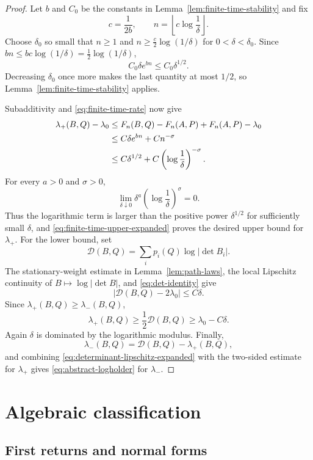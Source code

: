 \documentclass[11pt,a4paper]{amsart}
\theoremstyle{definition}
\theoremstyle{remark}
\numberwithin{equation}{section}
\newcommand{\1}{\boldsymbol 1}
\begin{document}
\begin{proof}
Let $b$ and $C_0$ be the constants in
Lemma~\ref{lem:finite-time-stability} and fix
$$
 c=\frac1{2b},
 \qquad
 n=\left\lfloor c\log\frac1\delta\right\rfloor.
$$
Choose $\delta_0$ so small that $n\ge1$ and
$n\ge\tfrac c2\log(1/\delta)$ for $0<\delta<\delta_0$.  Since
$bn\le bc\log(1/\delta)=\tfrac12\log(1/\delta)$,
\begin{equation}\label{eq:finite-time-smallness-expanded}
 C_0\delta e^{bn}\le C_0\delta^{1/2}.
\end{equation}
Decreasing $\delta_0$ once more makes the last quantity at most
$1/2$, so Lemma~\ref{lem:finite-time-stability} applies.

Subadditivity and \eqref{eq:finite-time-rate} now give
\begin{align}
 \lambda_+(B,Q)-\lambda_0
 &\le F_n(B,Q)-F_n(A,P)+F_n(A,P)-\lambda_0\notag\\
 &\le C\delta e^{bn}+Cn^{-\sigma}\notag\\
 &\le C\delta^{1/2}
 +C\left(\log\frac1\delta\right)^{-\sigma}.
 \label{eq:finite-time-upper-expanded}
\end{align}
For every $a>0$ and $\sigma>0$,
$$
 \lim_{\delta\downarrow0}
 \delta^a\left(\log\frac1\delta\right)^\sigma=0.
$$
Thus the logarithmic term is larger than the positive power
$\delta^{1/2}$ for sufficiently small $\delta$, and
\eqref{eq:finite-time-upper-expanded} proves the desired upper bound for
$\lambda_+$.
For the lower bound, set
$$
 \mathcal D(B,Q)=\sum_i p_i(Q)\log|\det B_i|.
$$
The stationary-weight estimate in Lemma~\ref{lem:path-laws}, the local
Lipschitz continuity of $B\mapsto\log|\det B|$, and
\eqref{eq:det-identity} give
\begin{equation}\label{eq:determinant-lipschitz-expanded}
 |\mathcal D(B,Q)-2\lambda_0|\le C\delta.
\end{equation}
Since $\lambda_+(B,Q)\ge\lambda_-(B,Q)$,
$$
 \lambda_+(B,Q)
 \ge\frac12\mathcal D(B,Q)
 \ge\lambda_0-C\delta.
$$
Again $\delta$ is dominated by the logarithmic modulus.  Finally,
$$
 \lambda_-(B,Q)=\mathcal D(B,Q)-\lambda_+(B,Q),
$$
and combining \eqref{eq:determinant-lipschitz-expanded} with the two-sided
estimate for $\lambda_+$ gives \eqref{eq:abstract-logholder} for
$\lambda_-$.
\end{proof}

\section{Algebraic classification}
\subsection{First returns and  normal forms}
\label{sec:normal}
\end{document}

